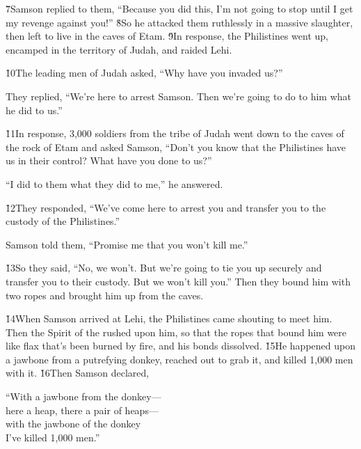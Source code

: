 \v{7}Samson replied to them, ``Because you did this, I'm not going to stop until I get my revenge against you!'' \v{8}So he attacked them ruthlessly in a massive slaughter, then left to live in the caves of Etam. \v{9}In response, the Philistines went up, encamped in the territory of Judah, and raided Lehi.

\v{10}The leading men of Judah asked, ``Why have you invaded us?''

They replied, ``We're here to arrest Samson. Then we're going to do to him what he did to us.''

\v{11}In response, 3,000 soldiers from the tribe of Judah went down to the caves of the rock of Etam and asked Samson, ``Don't you know that the Philistines have us in their control? What have you done to us?''

``I did to them what they did to me,'' he answered.

\v{12}They responded, ``We've come here to arrest you and transfer you to the custody of the Philistines.''

Samson told them, ``Promise me that you won't kill me.''

\v{13}So they said, ``No, we won't. But we're going to tie you up securely and transfer you to their custody. But we won't kill you.'' Then they bound him with two ropes and brought him up from the caves.

\v{14}When Samson arrived at Lehi, the Philistines came shouting to meet him. Then the Spirit of the  rushed upon him, so that the ropes that bound him were like flax that's been burned by fire, and his bonds dissolved. \v{15}He happened upon a jawbone from a putrefying donkey, reached out to grab it, and killed 1,000 men with it. \v{16}Then Samson declared,

\begin{poetry}
\poeml ``With a jawbone from the donkey--- \\
\poemll    here a heap, there a pair of heaps--- \\
\poeml with the jawbone of the donkey \\
\poemll    I've killed 1,000 men.''
\end{poetry}

